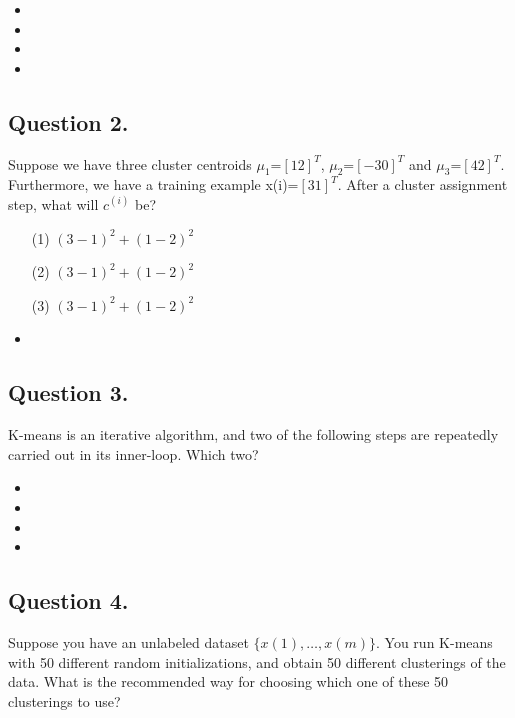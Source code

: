 \documentclass[11pt]{article} %
\begin{document}
\begin{itemize}
	\item 
	\item
	\item 
	\item 
	
\end{itemize}
\subsection*{Question 2.} 
Suppose we have three cluster centroids $\mu_1$=$[1 2]^T$, $\mu_2$=$[-3 0]^T$ and $\mu_3$=$[4 2]^T$. 
Furthermore, we have a training example x(i)=$[3 1]^T$. After a cluster assignment step, what will $c^{(i)}$ be?

\begin{itemize}
	\item[(1)] $(3-1)^2 + (1-2)^2 $
	\item[(2)] $(3-1)^2 + (1-2)^2 $
	\item[(3)] $(3-1)^2 + (1-2)^2 $
	\item 
	
\end{itemize}

\subsection*{Question 3.}
K-means is an iterative algorithm, and two of the following steps are repeatedly carried out in its inner-loop. Which two?
\begin{itemize}
	\item 
	\item
	\item 
	\item 
	
\end{itemize}

\subsection*{Question 4. }
Suppose you have an unlabeled dataset $\{x(1),\ldots,x(m)\}$. You run K-means with 50 different random
initializations, and obtain 50 different clusterings of the data. 
What is the recommended way for choosing which one of these 50 clusterings to use?
\end{document}
